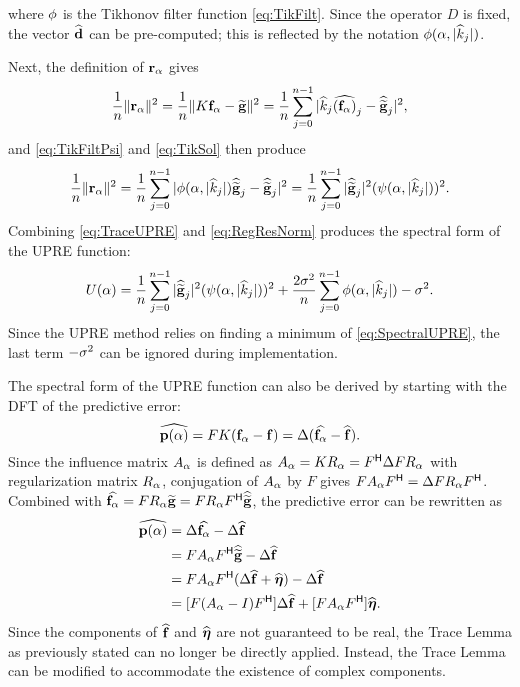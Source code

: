 where $\phi$ is the Tikhonov filter function \eqref{eq:TikFilt}. Since the operator $D$ is fixed, the vector $\widehat{\mathbf{d}}$ can be pre-computed; this is reflected by the notation $\phi(\alpha,|\widehat{k}_j|)$. \par
Next, the definition of $\mathbf{r}_{\alpha}$ gives
\[\frac{1}{n}\|\mathbf{r}_{\alpha}\|^2 = \frac{1}{n}\|K\mathbf{f}_{\alpha} - \widetilde{\mathbf{g}}\|^2 = \frac{1}{n}\sum_{j = 0}^{n-1} |\widehat{k}_j\widehat{(\mathbf{f}_{\alpha})}_j - \widehat{\widetilde{\mathbf{g}}}_j|^2,\]
and \eqref{eq:TikFiltPsi} and \eqref{eq:TikSol} then produce
\begin{equation}
\frac{1}{n}\|\mathbf{r}_{\alpha}\|^2 = \frac{1}{n}\sum_{j = 0}^{n-1} |\phi(\alpha,|\widehat{k}_j|)\widehat{\widetilde{\mathbf{g}}}_j - \widehat{\widetilde{\mathbf{g}}}_j|^2 = \frac{1}{n}\sum_{j = 0}^{n-1} |\widehat{\widetilde{\mathbf{g}}}_j|^2(\psi(\alpha,|\widehat{k}_j|))^2.
\label{eq:RegResNorm}
\end{equation}
Combining \eqref{eq:TraceUPRE} and \eqref{eq:RegResNorm} produces the spectral form of the UPRE function:
\begin{equation}
U(\alpha) = \frac{1}{n}\sum_{j = 0}^{n-1} |\widehat{\widetilde{\mathbf{g}}}_j|^2(\psi(\alpha,|\widehat{k}_j|))^2 + \frac{2\sigma^2}{n}\sum_{j = 0}^{n-1} \phi(\alpha,|\widehat{k}_j|) - \sigma^2.
\label{eq:SpectralUPRE}
\end{equation} 
Since the UPRE method relies on finding a minimum of \eqref{eq:SpectralUPRE}, the last term $-\sigma^2$ can be ignored during implementation. \par
The spectral form of the UPRE function can also be derived by starting with the DFT of the predictive error:
\[\widehat{\mathbf{p}(\alpha)} = FK(\mathbf{f}_{\alpha} - \mathbf{f}) = \Delta(\widehat{\mathbf{f}_{\alpha}} - \widehat{\mathbf{f}}).\]
Since the influence matrix $A_{\alpha}$ is defined as $A_{\alpha} = KR_{\alpha} = {F}^\mathsf{H}\Delta{F}R_{\alpha}$ with regularization matrix $R_{\alpha}$, conjugation of $A_{\alpha}$ by $F$ gives $FA_{\alpha}{{F}^\mathsf{H}} = \Delta{F}R_{\alpha}{{F}^\mathsf{H}}$. Combined with $\widehat{\mathbf{f}_{\alpha}} = FR_{\alpha}\widetilde{\mathbf{g}} = FR_{\alpha}{{F}^\mathsf{H}}\widehat{\widetilde{\mathbf{g}}}$, the predictive error can be rewritten as
\begin{align*}
\widehat{\mathbf{p}(\alpha)} &= \Delta\widehat{\mathbf{f}_{\alpha}} - \Delta\widehat{\mathbf{f}} \\
&= FA_{\alpha}{{F}^\mathsf{H}}\widehat{\widetilde{\mathbf{g}}} - \Delta\widehat{\mathbf{f}} \\
&= FA_{\alpha}{{F}^\mathsf{H}}(\Delta\widehat{\mathbf{f}} + \widehat{\boldsymbol{\eta}}) - \Delta\widehat{\mathbf{f}} \\
&= [F(A_{\alpha} - I){F}^\mathsf{H}]\Delta\widehat{\mathbf{f}} + [FA_{\alpha}{{F}^\mathsf{H}}]\widehat{\boldsymbol{\eta}}.
\end{align*}
Since the components of $\widehat{\mathbf{f}}$ and $\widehat{\boldsymbol{\eta}}$ are not guaranteed to be real, the Trace Lemma as previously stated can no longer be directly applied. Instead, the Trace Lemma can be modified to accommodate the existence of complex components.

